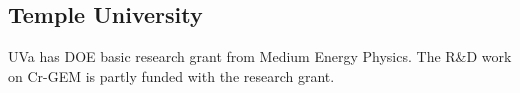\subsection{Temple University} 
UVa has DOE basic research grant from Medium Energy Physics. The R\&D work on Cr-GEM is partly funded with the research grant.